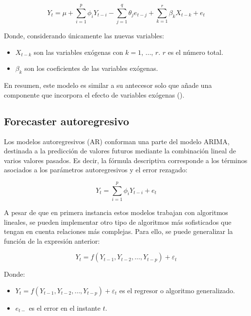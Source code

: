 \documentclass[12pt,a4paper]{report}
\begin{document}
\begin{equation*}
    Y_t = \mu + \sum_{i=1}^{p} \phi_i Y_{t-i} - \sum_{j=1}^{q} \theta_j e_{t-j} + \sum_{k=1}^{r} \beta_k X_{t-k} + e_t
\end{equation*}

Donde, considerando únicamente las nuevas variables:

\begin{itemize}
    \item $X_{t-k}$ son las variables exógenas con $k = 1$, ..., $r$. $r$ es el número total.

    \item $\beta_k$ son los coeficientes de las variables exógenas.
\end{itemize}

En resumen, este modelo es similar a su antecesor solo que añade una componente que incorpora el efecto de variables exógenas (\cite{jacomeGarcia2024}).

\subsection{Forecaster autoregresivo}

Los modelos autoregresivos (AR) conforman una parte del modelo ARIMA, destinada a la predicción de valores futuros mediante la combinación lineal de varios valores pasados. Es decir, la fórmula descriptiva corresponde a los términos asociados a los parámetros autoregresivos y el error rezagado:

\begin{equation*}
    Y_t = \sum_{i=1}^{p} \phi_i Y_{t-i} + e_t
\end{equation*}


A pesar de que en primera instancia estos modelos trabajan con algoritmos lineales, se pueden implementar otro tipo de algoritmos más sofisticados que tengan en cuenta relaciones más complejas. Para ello, se puede generalizar la función de la expresión anterior:

\begin{equation*}
    Y_t = f(Y_{t-1}, Y_{t-2}, \dots, Y_{t-p}) + \varepsilon_t
\end{equation*}

Donde:

\begin{itemize}
    \item $Y_t = f(Y_{t-1}, Y_{t-2}, \dots, Y_{t-p}) + \varepsilon_t$ es el regresor o algoritmo generalizado.
    \item $e_{t-}$ es el error en el instante $t$.
\end{itemize}
\end{document}
